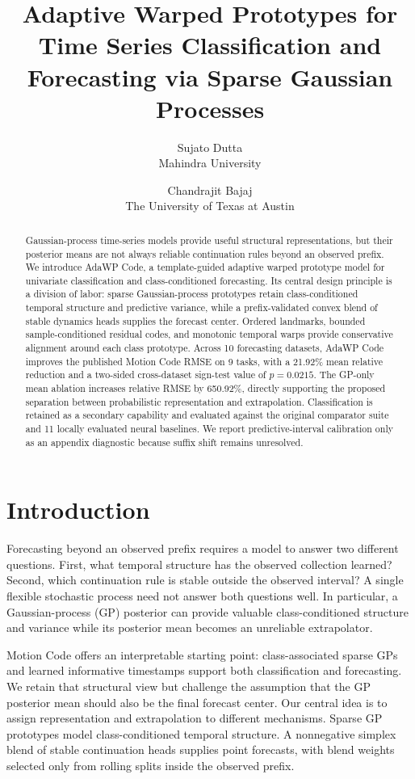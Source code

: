 \documentclass[11pt]{article}
\title{Adaptive Warped Prototypes for Time Series Classification and Forecasting via Sparse Gaussian Processes}
\author{Sujato Dutta\\
Mahindra University
\and
Chandrajit Bajaj\\
The University of Texas at Austin}
\date{}
\newcommand{\method}{AdaWP Code}
\newcommand{\mc}{Motion Code}
\begin{document}
\maketitle

\begin{abstract}
Gaussian-process time-series models provide useful structural representations, but their posterior means are not always reliable continuation rules beyond an observed prefix. We introduce \method{}, a template-guided adaptive warped prototype model for univariate classification and class-conditioned forecasting. Its central design principle is a division of labor: sparse Gaussian-process prototypes retain class-conditioned temporal structure and predictive variance, while a prefix-validated convex blend of stable dynamics heads supplies the forecast center. Ordered landmarks, bounded sample-conditioned residual codes, and monotonic temporal warps provide conservative alignment around each class prototype. Across 10 forecasting datasets, \method{} improves the published \mc{} RMSE on 9 tasks, with a 21.92\% mean relative reduction and a two-sided cross-dataset sign-test value of $p=0.0215$. The GP-only mean ablation increases relative RMSE by 650.92\%, directly supporting the proposed separation between probabilistic representation and extrapolation. Classification is retained as a secondary capability and evaluated against the original comparator suite and 11 locally evaluated neural baselines. We report predictive-interval calibration only as an appendix diagnostic because suffix shift remains unresolved.
\end{abstract}

\section{Introduction}

Forecasting beyond an observed prefix requires a model to answer two different questions. First, what temporal structure has the observed collection learned? Second, which continuation rule is stable outside the observed interval? A single flexible stochastic process need not answer both questions well. In particular, a Gaussian-process (GP) posterior can provide valuable class-conditioned structure and variance while its posterior mean becomes an unreliable extrapolator.

\mc{} \citep{bajaj2024motion} offers an interpretable starting point: class-associated sparse GPs and learned informative timestamps support both classification and forecasting. We retain that structural view but challenge the assumption that the GP posterior mean should also be the final forecast center. Our central idea is to assign representation and extrapolation to different mechanisms. Sparse GP prototypes model class-conditioned temporal structure. A nonnegative simplex blend of stable continuation heads supplies point forecasts, with blend weights selected only from rolling splits inside the observed prefix.
\end{document}
